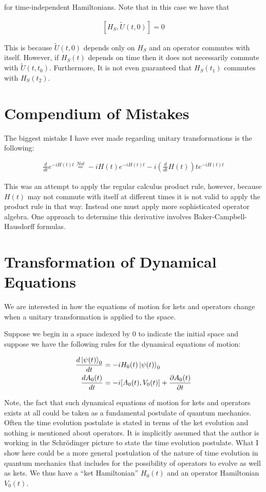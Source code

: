 \documentclass[12pt]{article}
\newcommand{\ddt}[1]{\frac{d #1}{dt}}
\begin{document}
for time-independent Hamiltonians.
Note that in this case we have that 

\begin{align}
\left[H_S,\tilde{U}(t,0)\right] = 0
\end{align}

This is because $\tilde{U}(t,0)$ depends only on $H_S$ and an operator commutes with itself. However, if $H_S(t)$ depends on time then it does not necessarily commute with $\tilde{U}(t,t_0)$. Furthermore, It is not even guaranteed that $H_S(t_1)$ commutes with $H_S(t_2)$.


\section{Compendium of Mistakes}

The biggest mistake I have ever made regarding unitary transformations is the following:

\begin{align}
\frac{d}{dt} e^{-iH(t) t} \stackrel{Not}{=} -iH(t) e^{-iH(t)t} -i \left(\frac{d}{d t} H(t)\right) t e^{-iH(t)t}
\end{align}

This was an attempt to apply the regular calculus product rule, however, because $H(t)$ may not commute with itself at different times it is not valid to apply the product rule in that way. Instead one must apply more sophisticated operator algebra. One approach to determine this derivative involves Baker-Campbell-Hausdorff formulas.




\section{Transformation of Dynamical Equations}

We are interested in how the equations of motion for kets and operators change when a unitary transformation is applied to the space. 

Suppose we begin in a space indexed by $0$ to indicate the initial space and suppose we have the following rules for the dynamical equations of motion:

\begin{align}
\ddt{\ket{\psi(t)}_0} &= -i H_0(t) \ket{\psi(t)}_0\\
\ddt{A_0(t)} &= -i[A_0(t),V_0(t)] + \frac{\partial A_0(t)}{\partial t}
\end{align}

Note, the fact that such dynamical equations of motion for kets and operators exists at all could be taken as a fundamental postulate of quantum mechanics. Often the time evolution postulate is stated in terms of the ket evolution and nothing is mentioned about operators. It is implicitly assumed that the author is working in the Schr{\"o}dinger picture to state the time evolution postulate. What I show here could be a more general postulation of the nature of time evolution in quantum mechanics that includes for the possibility of operators to evolve as well as kets. We thus have a ``ket Hamiltonian'' $H_0(t)$ and an operator Hamiltonian $V_0(t)$.
\end{document}
